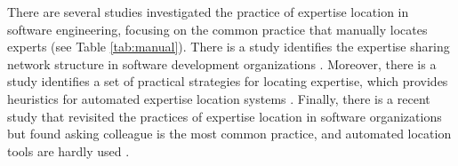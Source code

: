
There are several studies investigated the practice of expertise location in software engineering, focusing on the common practice that manually locates experts (see Table \ref{tab:manual}). There is a study identifies the expertise sharing network structure in software development organizations \cite{waterson1997dynamics}. Moreover, there is a study identifies a set of practical strategies for locating expertise, which provides heuristics for automated expertise location systems \cite{mcdonald1998just}. Finally, there is a recent study that revisited the practices of expertise location in software organizations but found asking colleague is the most common practice, and automated location tools are hardly used \cite{yarosh2013need}.

